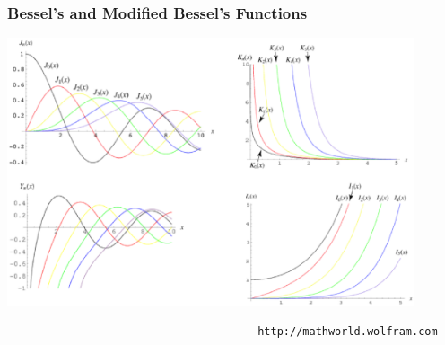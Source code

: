 \documentclass{beamer}
\begin{document}
\begin{frame}[fragile]
\frametitle{\textbf{Bessel's and Modified Bessel's Functions}}
\includegraphics[width=120mm]{bessel.eps}
\tiny{\begin{verbatim}
                                       http://mathworld.wolfram.com
\end{verbatim}}
\end{frame}
\end{document}
